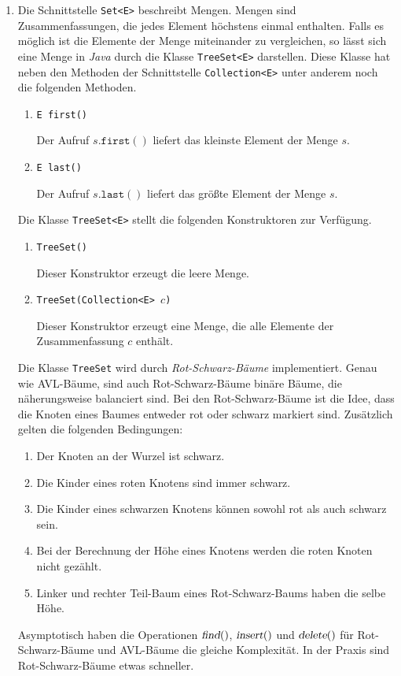 \begin{enumerate}
\item Die Schnittstelle \texttt{Set<E>} beschreibt Mengen.  Mengen sind Zusammenfassungen, die
      jedes Element h\"ochstens einmal enthalten.  Falls es m\"oglich ist die Elemente
      der Menge miteinander zu vergleichen, so l\"asst sich eine Menge in \textsl{Java}
      durch die Klasse \texttt{TreeSet<E>} darstellen.  Diese Klasse hat neben den Methoden
      der Schnittstelle \texttt{Collection<E>} unter anderem noch die folgenden Methoden.
      \begin{enumerate}
      \item \texttt{E first()}

            Der Aufruf $s.\mathtt{first}()$ liefert das kleinste Element der Menge $s$.
      \item \texttt{E last()}

            Der Aufruf $s.\mathtt{last}()$ liefert das gr\"o{\ss}te Element der Menge $s$.
      \end{enumerate}
      Die Klasse \texttt{TreeSet<E>} stellt die folgenden Konstruktoren zur Verf\"ugung.
      \begin{enumerate}
      \item \texttt{TreeSet()}

            Dieser Konstruktor erzeugt die leere Menge.
      \item \texttt{TreeSet(Collection<E> $c$)}
        
            Dieser Konstruktor erzeugt eine Menge, die alle Elemente der Zusammenfassung
            $c$ enth\"alt.
      \end{enumerate}
      Die Klasse \texttt{TreeSet} wird durch \emph{Rot-Schwarz-B\"aume} implementiert.
      Genau wie AVL-B\"aume, sind auch Rot-Schwarz-B\"aume bin\"are B\"aume, die n\"aherungsweise
      balanciert sind.  Bei den Rot-Schwarz-B\"aume ist die Idee, dass die Knoten
      eines Baumes entweder rot oder schwarz markiert sind.  Zus\"atzlich gelten die
      folgenden Bedingungen:
      \begin{enumerate}
      \item Der Knoten an der Wurzel ist schwarz.
      \item Die Kinder eines roten Knotens sind immer schwarz. 
      \item Die Kinder eines schwarzen Knotens k\"onnen sowohl rot als auch schwarz sein.  
      \item Bei der Berechnung der H\"ohe eines Knotens werden die roten
            Knoten nicht gez\"ahlt.
      \item Linker und rechter Teil-Baum eines Rot-Schwarz-Baums haben die 
            selbe H\"ohe.
      \end{enumerate}
      Asymptotisch haben die Operationen $\textsl{find}()$, $\textsl{insert}()$ und
      $\textsl{delete}()$ f\"ur Rot-Schwarz-B\"aume und AVL-B\"aume die gleiche Komplexit\"at.
      In der Praxis sind Rot-Schwarz-B\"aume etwas schneller.


\end{enumerate}
